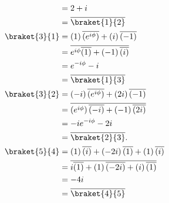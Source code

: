 \documentclass[10pt]{mypackage}
\begin{document}
\begin{enumerate}[(a)]
\begin{align*}
                    &= 2 + i\\
                    &= \overline{\braket{1}{2}}\\
      \braket{3}{1} &= \left(1\right)\overline{\left(e^{i\phi}\right)} + \left(i\right)\overline{\left(-1\right)}\\
                    &= \overline{e^{i\phi}\overline{\left(1\right)} + \left(-1\right)\overline{\left(i\right)}}\\
                    &= e^{-i\phi} - i\\
                    &= \overline{\braket{1}{3}}\\
      \braket{3}{2} &= \left(-i\right)\overline{\left(e^{i\phi}\right)} + \left(2i\right)\overline{\left(-1\right)}\\
                    &= \overline{\left(e^{i\phi}\right)\overline{\left(-i\right)} + \left(-1\right)\overline{\left(2i\right)}}\\
                    &= -ie^{-i\phi} -2i\\
                    &= \overline{\braket{2}{3}}.\\
      \braket{5}{4} &= \left(1\right)\overline{\left(i\right)} + \left(-2i\right)\overline{\left(1\right)} + \left(1\right)\overline{\left(i\right)}\\
                    &= \overline{i\overline{\left(1\right)} + \left(1\right)\overline{\left(-2i\right)} + \left(i\right)\overline{\left(1\right)}}\\
                    &= -4i\\
                    &= \overline{\braket{4}{5}}
    \end{align*}
\end{enumerate}
\end{document}
